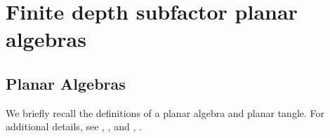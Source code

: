 
%
%

\chapter{Finite depth subfactor planar algebras}\label{planar_algebras_chapter}



\section{Planar Algebras}\label{Planar_algebras}

We briefly recall the definitions of a planar algebra and planar tangle. For additional details, see \cite{Jon99}, \cite{GJS10}, and \cite{GJS12}, \cite{HP14}.

